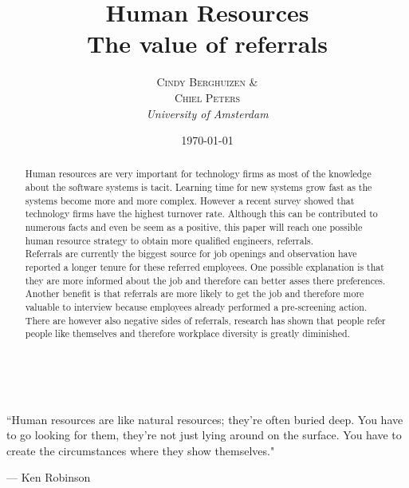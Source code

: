 \documentclass[a4paper, 11pt]{article} %
\title{\textbf{Human Resources}\\ %
The value of referrals} %
\author{\textsc{Cindy Berghuizen \& \\ Chiel Peters} %
\\{\textit{University of Amsterdam}}} %
\date{\today} %
\makeatletter
\renewcommand{\maketitle}{ %
\begin{flushright} %
{\LARGE\@title} %

\vspace{50pt} %

{\large\@author} %
\\\@date %

\vspace{20pt} %
\end{flushright}
}
\makeatother
\begin{document}
\maketitle %



\epigraph{``Human resources are like natural resources; they're often buried deep. You have to go looking for them, they're not just lying around on the surface. You have to create the circumstances where they show themselves."}{--- \textup{Ken Robinson}}

\begin{abstract}
Human resources are very important for technology firms as most of the knowledge about the software systems is tacit. Learning time for new systems grow fast as the systems become more and more complex. However a recent survey showed that technology firms have the highest turnover rate\cite{turnover}. Although this can be contributed to numerous facts and even be seem as a positive, this paper will reach one possible human resource strategy to obtain more qualified engineers, referrals. \\

Referrals are currently the biggest source for job openings \cite{referralpercentage} and observation have reported a longer tenure for these referred employees. One possible explanation is that they are more informed about the job and therefore can better asses there preferences. Another benefit is that referrals are more likely to get the job and therefore more valuable to interview because employees already performed a pre-screening action. There are however also negative sides of referrals, research has shown that people refer people like themselves \cite{second} and therefore workplace diversity is greatly diminished.
\end{abstract}


\vspace{30pt} %

\end{document}
